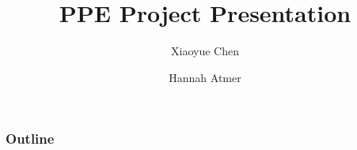 \documentclass{beamer}
\title{PPE Project Presentation}
\author{Xiaoyue Chen \and Hannah Atmer}
\begin{document}
\begin{frame}
  \titlepage
\end{frame}

\begin{frame}
  \frametitle{Outline}
  \tableofcontents
\end{frame}





\end{document}
